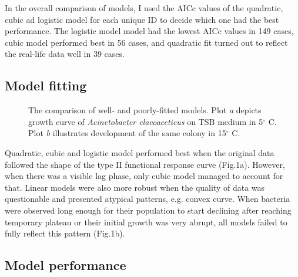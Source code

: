 \documentclass[a4paper,11pt]{article}
\begin{document}
In the overall comparison of models, I used the AICc values of the quadratic, cubic ad logistic model for each unique ID to decide which one had the best performance. The logistic model model had the lowest AICc values in 149 cases, cubic model performed best in 56 cases, and quadratic fit turned out to reflect the real-life data well in 39 cases.

\subsection{Model fitting}

 \begin{figure}[!ht]
 \hfill 	
\caption{The comparison of well- and poorly-fitted models. Plot \textit{a} depicts growth curve of  \textit{Acinetobacter clacoaceticus} on TSB medium in 5$^{\circ}$ C. Plot \textit{b} illustrates development of the same colony in 15$^{\circ}$ C.}
\end{figure}

Quadratic, cubic and logistic model performed best when the original data followed the shape of the type II functional response curve (Fig.1a). However, when there was a visible lag phase, only cubic model managed to account for that. Linear models were also more robust when the quality of data was questionable and presented atypical patterns, e.g. convex curve. When bacteria were observed long enough for their population to start declining after reaching temporary plateau or their initial growth was very abrupt, all models failed to fully reflect this pattern (Fig.1b).\par

\subsection{Model performance}
\end{document}

